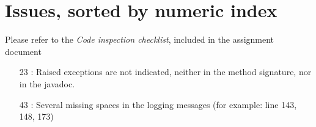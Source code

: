 \section{Issues, sorted by numeric index}
Please refer to the \textit{Code inspection checklist}, included in the assignment document

\begin{enumerate}
 \item [23]: Raised exceptions are not indicated, neither in the method signature, nor in the javadoc.
 \item [43]: Several missing spaces in the logging messages (for example: line 143, 148, 173)
\end{enumerate}

